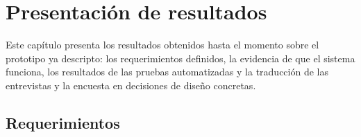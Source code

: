
\chapter{Presentación de resultados}\label{cap:resultados}

Este capítulo presenta los resultados obtenidos hasta el momento sobre el
prototipo ya descripto: los requerimientos definidos, la evidencia de
que el sistema funciona, los resultados de las pruebas automatizadas y
la traducción de las entrevistas y la encuesta en decisiones de diseño
concretas.

\section{Requerimientos}

